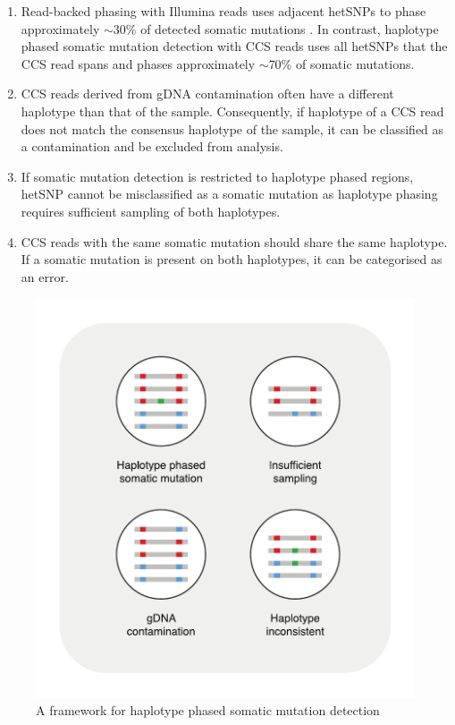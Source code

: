 \begin{enumerate}
\item Read-backed phasing with Illumina reads uses adjacent hetSNPs to phase approximately $\sim$30\% of detected somatic mutations \cite{Nik-Zainal2012-nz}. In contrast, haplotype phased somatic mutation detection with CCS reads uses all hetSNPs that the CCS read spans and phases approximately $\sim$70\% of somatic mutations.
\item CCS reads derived from gDNA contamination often have a different haplotype than that of the sample. Consequently, if haplotype of a CCS read does not match the consensus haplotype of the sample, it can be classified as a contamination and be excluded from analysis.
\item If somatic mutation detection is restricted to haplotype phased regions, hetSNP cannot be misclassified as a somatic mutation as haplotype phasing requires sufficient sampling of both haplotypes.
\item CCS reads with the same somatic mutation should share the same haplotype. If a somatic mutation is present on both haplotypes, it can be categorised as an error.
\end{enumerate}

\begin{figure}[htbp!]
\caption{A framework for haplotype phased somatic mutation detection}
\label{figure:haplotype-phased-somatic-mutation-detection}
\begin{centering}
\includegraphics[width=\textwidth]{Vector/haplotype_phased_somatic_mutation_detection.pdf}
\end{centering}
\end{figure}

